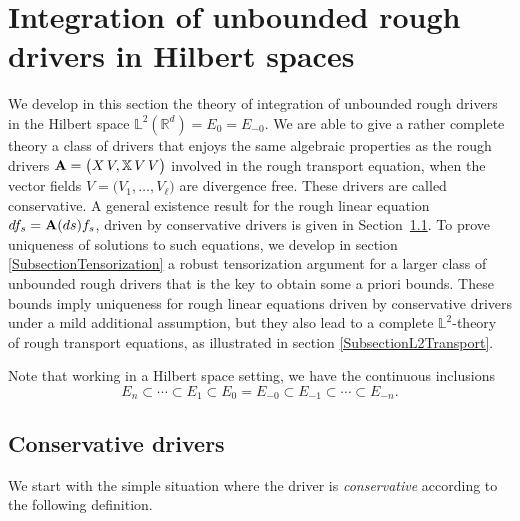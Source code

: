 \documentclass[11pt,a4paper]{amsart}
\newcommand{\RR}{\mathbb{R}}  \newcommand{\CC}{\mathbb{C}}  \newcommand{\LL}{\mathbb{L}}  \newcommand{\WW}{\mathbb{W}}
\newcommand{\bbX}{\mathbb{X}}
\newcommand{\ssk}{\smallskip}
\numberwithin{equation}{section} %
\begin{document}
\medskip


\section{Integration of unbounded rough drivers in Hilbert spaces}
\label{SectionHilbertSpaceTheory}

We develop in this section the theory of integration of unbounded rough drivers in the Hilbert space $\LL^2(\RR^d)=E_0=E_{-0}$. We are able to give a rather complete theory a class of drivers that enjoys the same algebraic properties as the rough drivers ${\bfA} = \big(X\,V,\bbX\,V\,V\big)$ involved in the rough transport equation, when the vector fields $V=\big(V_1,\dots,V_\ell\big)$ are divergence free. These drivers are called conservative. A general existence result for the rough linear equation $df_s = {\bf A}(ds)f_s$, driven by conservative drivers is given in Section~\ref{SubsectionIntegrationConservative}. To prove uniqueness of solutions to such equations, we develop in section \eqref{SubsectionTensorization} a robust tensorization argument for a larger class of unbounded rough drivers that is the key to obtain some a priori bounds. These bounds imply uniqueness for rough linear equations driven by conservative drivers under a mild additional assumption, but they also lead to a complete $\LL^2$-theory of rough transport equations, as illustrated in section \eqref{SubsectionL2Transport}.

\ssk

Note that working in a Hilbert space setting, we have the continuous inclusions
\begin{equation}
\label{EqDoubleInclusion}
E_n\subset \cdots \subset E_1\subset E_0 = E_{-0}\subset E_{-1}\subset \cdots\subset E_{-n}.
\end{equation}

\medskip

\subsection{Conservative drivers}
\label{SubsectionIntegrationConservative}

We start with the simple situation where the driver is \emph{conservative} according to the following definition.
\end{document}
